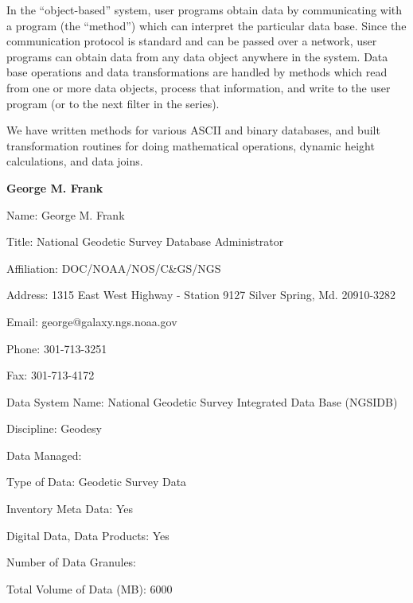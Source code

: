 In the ``object-based'' system, user programs obtain data by 
communicating with a program (the ``method'') which can interpret the 
particular data base.  Since the communication protocol is standard and 
can be passed over a network, user programs can obtain data from any data 
object anywhere in the system. Data base operations and data 
transformations are handled by methods which read from one or more data 
objects, process that information, and write to the user program
(or to the next filter in the series).

We have written methods for various ASCII and binary databases, and built 
transformation routines for doing mathematical operations, dynamic 
height calculations, and data joins.
\newpage

\begin{center}
\LARGE
{\bf  George M. Frank}
\end{center}
\large
{}
\normalsize
\smallskip
\begin{description}
\item{Name:}  George M. Frank
\item{Title:}  National Geodetic Survey Database Administrator
\item{Affiliation:}  DOC/NOAA/NOS/C\&GS/NGS
\item{Address:}  1315 East West Highway - Station 9127
			Silver Spring, Md. 20910-3282
\item{Email:}  george@galaxy.ngs.noaa.gov
\item{Phone:}  301-713-3251
\item{Fax:}  301-713-4172
\end{description}
\medskip
\large
{}
\normalsize
\medskip
\begin{description}

\item{Data System Name:}  National Geodetic Survey Integrated Data Base 
(NGSIDB)
\item{Discipline:}  Geodesy
\item{Data Managed:}
	\begin{description}
	\item{Type of Data:}  Geodetic Survey Data
	\item{Inventory Meta Data:}  Yes
	\item{Digital Data, Data Products:}  Yes
	\item{Number of Data Granules:}  
	\item{Total Volume of Data (MB):}  6000
	\end{description}
\end{description}

